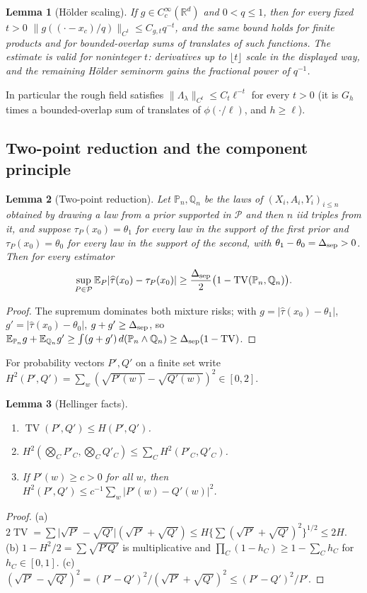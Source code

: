 \documentclass[11pt]{article}
\newtheorem{lemma}[lemma]{Lemma}
\DeclareMathOperator{\TV}{TV}
\newcommand{\E}{\mathbb{E}}
\newcommand{\PP}{\mathbb{P}}
\newcommand{\R}{\mathbb{R}}
\newcommand{\cP}{\mathcal{P}}
\newcommand{\norm}[1]{\lVert #1\rVert}
\newcommand{\abs}[1]{\lvert #1\rvert}
\begin{document}
\begin{lemma}[Hölder scaling]\label{lem:holder-scaling}
If \(g\in C_c^\infty(\R^d)\) and \(0<q\le1\), then for every fixed \(t>0\)
\(\norm{g((\cdot-x_c)/q)}_{C^t}\le C_{g,t}q^{-t}\), and the same bound holds
for finite products and for bounded-overlap sums of translates of such
functions.  The estimate is valid for noninteger \(t\): derivatives up to
\(\lfloor t\rfloor\) scale in the displayed way, and the remaining Hölder
seminorm gains the fractional power of \(q^{-1}\).
\end{lemma}
In particular the rough field satisfies
\(\norm{\Lambda_\lambda}_{C^t}\le C_t\ell^{-t}\) for every \(t>0\) (it is
\(G_h\) times a bounded-overlap sum of translates of \(\phi(\cdot/\ell)\),
and \(h\ge\ell\)).

\subsection{Two-point reduction and the component principle}
\begin{lemma}[Two-point reduction]\label{lem:two-point}
Let \(\PP_n,\mathbb Q_n\) be the laws of \((X_i,A_i,Y_i)_{i\le n}\) obtained
by drawing a law from a prior supported in \(\cP\) and then \(n\) iid
triples from it, and suppose \(\tau_P(x_0)=\theta_1\) for every law in the
support of the first prior and \(\tau_P(x_0)=\theta_0\) for every law in
the support of the second, with \(\theta_1-\theta_0=\Delta_{\rm sep}>0\).
Then for every estimator
\[
 \sup_{P\in\cP}\E_P\abs{\widehat\tau(x_0)-\tau_P(x_0)}
 \ge\frac{\Delta_{\rm sep}}2\bigl(1-\TV(\PP_n,\mathbb Q_n)\bigr).
\]
\end{lemma}
\begin{proof}
The supremum dominates both mixture risks; with
\(g=\abs{\widehat\tau(x_0)-\theta_1}\), \(g'=\abs{\widehat\tau(x_0)-\theta_0}\),
\(g+g'\ge\Delta_{\rm sep}\), so
\(\E_{\PP_n}g+\E_{\mathbb Q_n}g'\ge\int(g+g')\,d(\PP_n\wedge\mathbb Q_n)\ge\Delta_{\rm sep}(1-\TV)\).
\end{proof}

For probability vectors \(P',Q'\) on a finite set write
\(H^2(P',Q')=\sum_w(\sqrt{P'(w)}-\sqrt{Q'(w)})^2\in[0,2]\).

\begin{lemma}[Hellinger facts]\label{lem:hellinger}
\begin{enumerate}[label=(\alph*),leftmargin=*]
\item \(\TV(P',Q')\le H(P',Q')\).
\item \(H^2(\bigotimes_CP'_C,\bigotimes_CQ'_C)\le\sum_CH^2(P'_C,Q'_C)\).
\item If \(P'(w)\ge c>0\) for all \(w\), then
\(H^2(P',Q')\le c^{-1}\sum_w\abs{P'(w)-Q'(w)}^2\).
\end{enumerate}
\end{lemma}
\begin{proof}
(a) \(2\TV=\sum\abs{\sqrt{P'}-\sqrt{Q'}}(\sqrt{P'}+\sqrt{Q'})
\le H\{\sum(\sqrt{P'}+\sqrt{Q'})^2\}^{1/2}\le2H\).
(b) \(1-H^2/2=\sum\sqrt{P'Q'}\) is multiplicative and
\(\prod_C(1-h_C)\ge1-\sum_Ch_C\) for \(h_C\in[0,1]\).
(c) \((\sqrt{P'}-\sqrt{Q'})^2=(P'-Q')^2/(\sqrt{P'}+\sqrt{Q'})^2\le(P'-Q')^2/P'\).
\end{proof}
\end{document}
